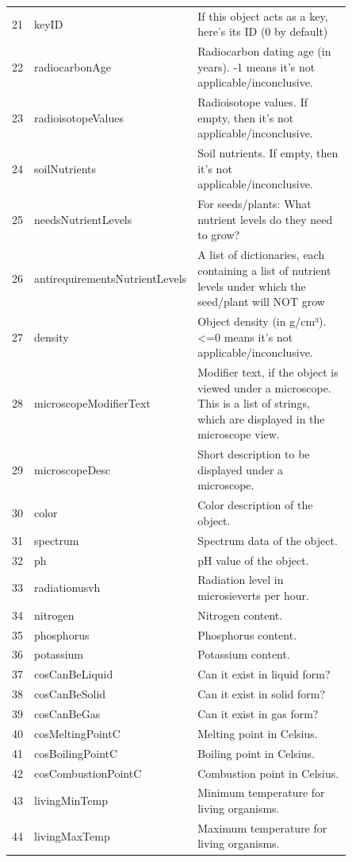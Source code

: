 \documentclass{article}
\begin{document}
\begin{table}[t!]
\begin{tabular}{cp{0.20\linewidth}p{0.65\linewidth}}
21 & keyID & If this object acts as a key, here's its ID (0 by default) \\
22 & radiocarbonAge & Radiocarbon dating age (in years). -1 means it's not applicable/inconclusive. \\
23 & radioisotopeValues & Radioisotope values. If empty, then it's not applicable/inconclusive. \\
24 & soilNutrients & Soil nutrients. If empty, then it's not applicable/inconclusive. \\
25 & needsNutrientLevels & For seeds/plants: What nutrient levels do they need to grow? \\
26 & antirequirementsNutrientLevels & A list of dictionaries, each containing a list of nutrient levels under which the seed/plant will NOT grow \\
27 & density & Object density (in g/cm³). <=0 means it's not applicable/inconclusive. \\
28 & microscopeModifierText & Modifier text, if the object is viewed under a microscope. This is a list of strings, which are displayed in the microscope view. \\
29 & microscopeDesc & Short description to be displayed under a microscope. \\
30 & color & Color description of the object. \\
31 & spectrum & Spectrum data of the object. \\
32 & ph & pH value of the object. \\
33 & radiationusvh & Radiation level in microsieverts per hour. \\
34 & nitrogen & Nitrogen content. \\
35 & phosphorus & Phosphorus content. \\
36 & potassium & Potassium content. \\
37 & cosCanBeLiquid & Can it exist in liquid form? \\
38 & cosCanBeSolid & Can it exist in solid form? \\
39 & cosCanBeGas & Can it exist in gas form? \\
40 & cosMeltingPointC & Melting point in Celsius. \\
41 & cosBoilingPointC & Boiling point in Celsius. \\
42 & cosCombustionPointC & Combustion point in Celsius. \\
43 & livingMinTemp & Minimum temperature for living organisms. \\
44 & livingMaxTemp & Maximum temperature for living organisms. \\

\end{tabular}
\end{table}
\end{document}
